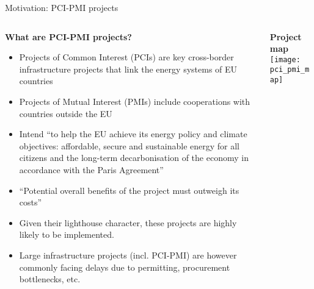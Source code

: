 \documentclass[10pt,aspectratio=169,dvipsnames]{beamer}
\begin{document}
\begin{frame}{Motivation: PCI-PMI projects}
  \scriptsize
  \begin{columns}[T] %
    \begin{column}{.63\textwidth}
        \begin{minipage}[t][.45\textheight]{\linewidth}
            \begin{alertblock}{\textbf{What are PCI-PMI projects?}}
                \begin{itemize}
                  \setlength\itemsep{0.85em}
                  \item Projects of Common Interest (PCIs) are key \alert{cross-border infrastructure projects} that link the energy systems of EU countries
                  \item Projects of Mutual Interest (PMIs) include cooperations with countries outside the EU
                  \item Intend ``to help the EU achieve its \alert{energy policy and climate objectives}: affordable, secure and sustainable energy for all citizens and the long-term decarbonisation of the economy in accordance with the \alert{Paris Agreement}''
                  \item ``Potential overall benefits of the project must outweigh its costs'' 
                  \item Given their \alert{lighthouse character}, these projects are highly likely to be implemented. 
                  \item Large infrastructure projects (incl. PCI-PMI) are however commonly facing delays due to permitting, procurement bottlenecks, etc.
                \end{itemize}
            \end{alertblock}
        \end{minipage}
    \end{column}
    
    \begin{column}{.36\textwidth}
        \begin{minipage}[t][.45\textheight]{\linewidth}
            \begin{alertblock}{\textbf{Project map}}
              \centering
              \texttt{[image: pci\_pmi\_map]}
            \end{alertblock}
        \end{minipage}
    \end{column}


\end{columns}
\end{frame}
\end{document}
